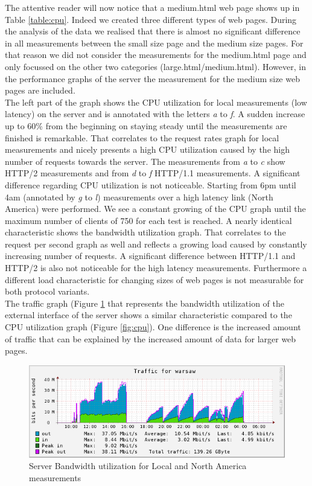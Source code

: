 The attentive reader will now  notice that a medium.html web page shows up in Table \ref{table:cpu}. Indeed we created three different types of web pages. During the analysis of the data we realised that there is almost no significant difference in all measurements between the small size page and the medium size pages. For that reason we did not consider the measurements for the medium.html page and only focussed on the other two categories (large.html/medium.html). However, in the performance graphs of the server the measurement for the medium size web pages are included.
\\ 
The left part of the graph shows the CPU utilization for local measurements (low latency) on the server and is annotated with the letters \textit{a} to \textit{f}. A sudden increase up to 60\% from the beginning on staying steady until the measurements are finished is remarkable. That correlates to the request rates graph for local measurements and nicely presents a high CPU utilization caused by the high number of requests towards the server. The measurements from \textit{a} to \textit{c} show HTTP/2 measurements and from \textit{d} to \textit{f} HTTP/1.1 measurements. A significant difference regarding CPU utilization is not noticeable. Starting from 6pm until 4am (annotated by \textit{g} to \textit{l}) measurements over a high latency link (North America) were performed. We see a constant growing of the CPU graph until the maximum number of clients of 750 for each test is reached. A nearly identical characteristic shows the bandwidth utilization graph. That correlates to the request per second graph as well and reflects a growing load caused by constantly increasing number of requests. A significant difference between HTTP/1.1 and HTTP/2 is also not noticeable for the high latency measurements. Furthermore a different load characteristic for changing sizes of web pages is not measurable for both protocol variants. 
\\
The traffic graph (Figure \ref{fig:network} that represents the bandwidth utilization of the external interface of the server shows a similar characteristic compared to the CPU utilization graph (Figure \ref{fig:cpu}). One difference is the increased amount of traffic that can be explained by the increased amount of data for larger web pages. 

\begin{figure}[H]
\centering
\includegraphics[scale=0.6,trim=0.0cm .0cm .0cm .0cm,clip]{images/network.png}
\caption{Server Bandwidth utilization for Local and North America measurements}
\label{fig:network}
\end{figure}

